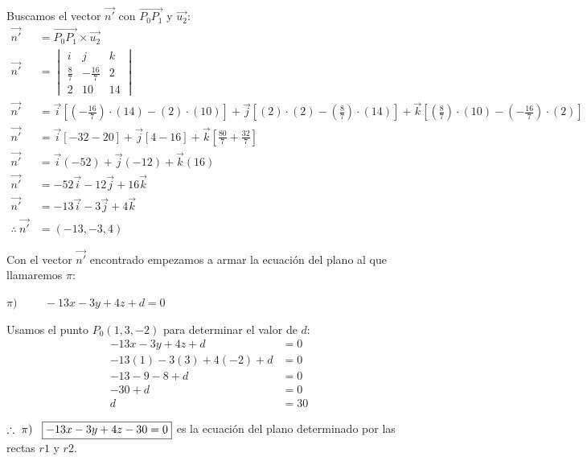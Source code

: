 \noindent Buscamos el vector $\vec{n'}$ con $\overrightarrow{P_0P_1}$ y $\vec{u_2}$:
\begin{align*}
	\vec{n'}              & = \overrightarrow{P_0P_1} \times \vec{u_2}                         \\
	\vec{n'}              & = \begin{vmatrix}
		                          i           & j             & k  \\
		                          \frac{8}{7} & -\frac{16}{7} & 2  \\
		                          2           & 10            & 14
	                          \end{vmatrix}                                 \\
	\vec{n'}              & = \vec{i} \left[(-\frac{16}{7})\cdot(14) - (2)\cdot(10) \right]  +
	\vec{j} \left[ (2)\cdot(2) - (\frac{8}{7})\cdot(14) \right] +
	\vec{k} \left[ (\frac{8}{7})\cdot(10) - (-\frac{16}{7})\cdot(2) \right]                    \\
	\vec{n'}              & = \vec{i} \left[-32 - 20 \right]  +
	\vec{j} \left[ 4 - 16 \right] +
	\vec{k} \left[ \frac{80}{7} + \frac{32}{7} \right]                                         \\
	\vec{n'}              & = \vec{i} (-52) + \vec{j} (- 12) + \vec{k} (16)                    \\
	\vec{n'}              & = -52\vec{i}- 12\vec{j} + 16\vec{k}                                \\
	\vec{n'}              & = -13\vec{i}- 3\vec{j} + 4\vec{k}                                  \\
	\therefore \ \vec{n'} & = \boxed{(-13, -3, 4)}
\end{align*}

\noindent Con el vector $\vec{n'}$ encontrado empezamos a armar la ecuación del plano al que llamaremos $\pi$:
\begin{center}
	$\pi) \hspace{1cm} -13x - 3y + 4z + d = 0$
\end{center}

\noindent Usamos el punto $P_0(1, 3, -2)$ para determinar el valor de $d$:
\begin{align*}
	-13x - 3y + 4z + d        & = 0          \\
	-13(1) - 3(3) + 4(-2) + d & = 0          \\
	-13 - 9 - 8 + d           & = 0          \\
	-30 + d                   & = 0          \\
	d                         & = \boxed{30}
\end{align*}

$\therefore \ \pi) \hspace{0.3cm} \boxed{-13x - 3y + 4z - 30 = 0}$ es la ecuación del plano determinado por las rectas $r1$ y $r2$.

